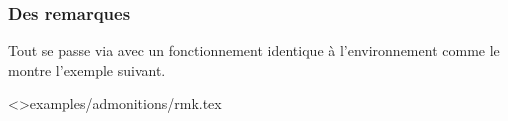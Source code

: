 \documentclass{../main/main}
\begin{document}

\subsubsection{Des remarques}

Tout se passe via  avec un fonctionnement identique à l'environnement  comme le montre l'exemple suivant.


\tdoclatexinput<>{examples/admonitions/rmk.tex}
\end{document}
